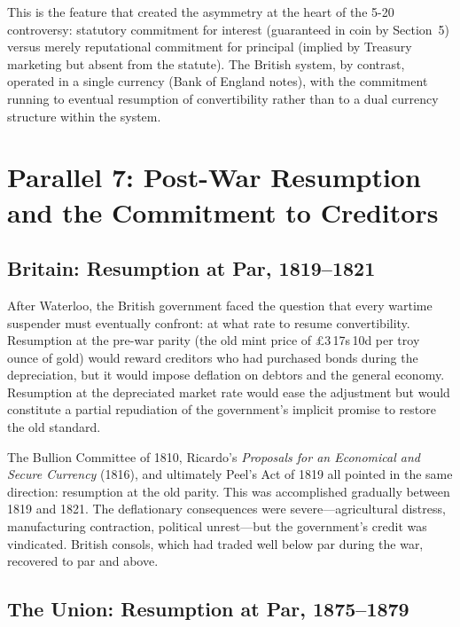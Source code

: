 \documentclass[12pt]{article}
\begin{document}
This is the feature that created the asymmetry at the heart of the 5-20
controversy: statutory commitment for interest (guaranteed in coin by
Section~5) versus merely reputational commitment for principal
(implied by Treasury marketing but absent from the statute). The British
system, by contrast, operated in a single currency (Bank of England
notes), with the commitment running to eventual resumption of
convertibility rather than to a dual currency structure within the
system.

\section{Parallel 7: Post-War Resumption and the Commitment to Creditors}
\label{sec:resumption}

\subsection{Britain: Resumption at Par, 1819--1821}

After Waterloo, the British government faced the question that every
wartime suspender must eventually confront: at what rate to resume
convertibility. Resumption at the pre-war parity (the old mint price of
\pounds 3\,17s\,10\textonehalf d per troy ounce of gold) would reward
creditors who had purchased bonds during the depreciation, but it would
impose deflation on debtors and the general economy. Resumption at the
depreciated market rate would ease the adjustment but would constitute a
partial repudiation of the government's implicit promise to restore the
old standard.

The Bullion Committee of 1810, Ricardo's \textit{Proposals for an
Economical and Secure Currency} (1816), and ultimately Peel's Act of
1819 all pointed in the same direction: resumption at the old parity.
This was accomplished gradually between 1819 and 1821. The deflationary
consequences were severe---agricultural distress, manufacturing
contraction, political unrest---but the government's credit was
vindicated. British consols, which had traded well below par during the
war, recovered to par and above.

\subsection{The Union: Resumption at Par, 1875--1879}
\end{document}
